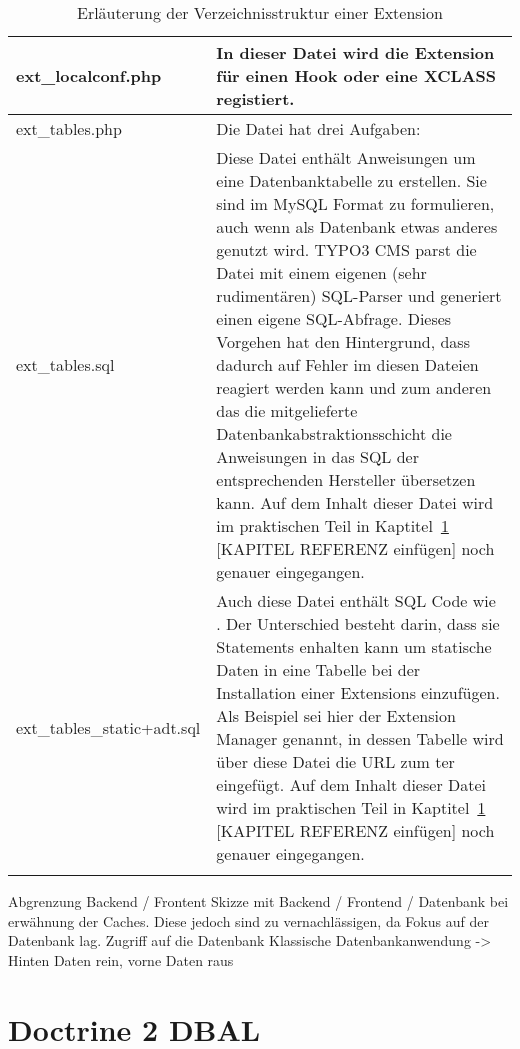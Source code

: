 \begin{longtable}{|l|p{}|}
	ext\_localconf.php & In dieser Datei wird die Extension für einen Hook oder eine XCLASS registiert.\\ \hline
	ext\_tables.php & Die Datei hat drei Aufgaben:
	\\ \hline
	ext\_tables.sql & Diese Datei enthält Anweisungen um eine Datenbanktabelle zu erstellen. Sie sind im MySQL Format zu formulieren, auch wenn als Datenbank etwas anderes genutzt wird. TYPO3 CMS parst die Datei mit einem eigenen (sehr rudimentären) SQL-Parser und generiert einen eigene SQL-Abfrage. Dieses Vorgehen hat den Hintergrund, dass dadurch auf Fehler im diesen Dateien reagiert werden kann und zum anderen das die mitgelieferte Datenbankabstraktionsschicht die Anweisungen in das SQL der entsprechenden Hersteller übersetzen kann. Auf dem Inhalt dieser Datei wird im praktischen Teil in Kaptitel~\ref{} [KAPITEL REFERENZ einfügen] noch genauer eingegangen.\\ \hline
	ext\_tables\_static+adt.sql & Auch diese Datei enthält SQL Code wie \pdf{ext\_tables.sql}. Der Unterschied besteht darin, dass sie \pdf{INSERT} Statements enhalten kann um statische Daten in eine Tabelle bei der Installation einer Extensions einzufügen. Als Beispiel sei hier der Extension Manager genannt, in dessen Tabelle wird über diese Datei die URL zum \gls{ter} eingefügt. Auf dem Inhalt dieser Datei wird im praktischen Teil in Kaptitel~\ref{} [KAPITEL REFERENZ einfügen] noch genauer eingegangen.\\ \hline
	\caption{Erläuterung der Verzeichnisstruktur einer Extension}
	\label{tab:extensionFolderStructure}
\end{longtable}


Abgrenzung Backend / Frontent
Skizze mit Backend / Frontend / Datenbank bei erwähnung der Caches. Diese jedoch sind zu vernachlässigen, da
Fokus auf der Datenbank lag.
Zugriff auf die Datenbank
Klassische Datenbankanwendung -> Hinten Daten rein, vorne Daten raus
\section{Doctrine 2 DBAL}
